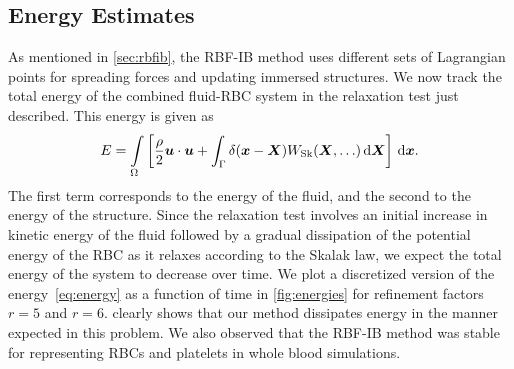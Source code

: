 \subsection{Energy Estimates}\label{sec:energy-est}

As mentioned in \cref{sec:rbfib}, the RBF-IB method uses different sets of Lagrangian points for spreading forces
and updating immersed structures. We now track the total energy of the combined fluid-RBC system in the relaxation
test just described.  This energy is given as 
\begin{align}
    E = \int\limits_\domain \left[\frac{\density}2\u\cdot\u + \int_\interface \Dirac(\x-\X)W_\text{Sk}(\X, \ldots)\d\X\right] \d\x.
\label{eq:energy}
\end{align}
The first term corresponds to the energy of the fluid, and the second to the energy of the structure. Since the
relaxation test involves an initial increase in kinetic energy of the fluid followed by a gradual dissipation of
the potential energy of the RBC as it relaxes according to the Skalak law, we expect the total energy of the
system to decrease over time. We plot a discretized version of the energy~\eqref{eq:energy} as a function of time
in \cref{fig:energies} for refinement factors $r=5$ and $r=6$.  clearly shows that our method
dissipates energy in the manner expected in this problem. We also observed that the RBF-IB method was stable for
representing RBCs and platelets in whole blood simulations.


